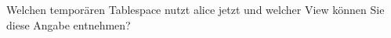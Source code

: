     \item Welchen temporären Tablespace nutzt alice jetzt und welcher View können Sie diese Angabe entnehmen?
